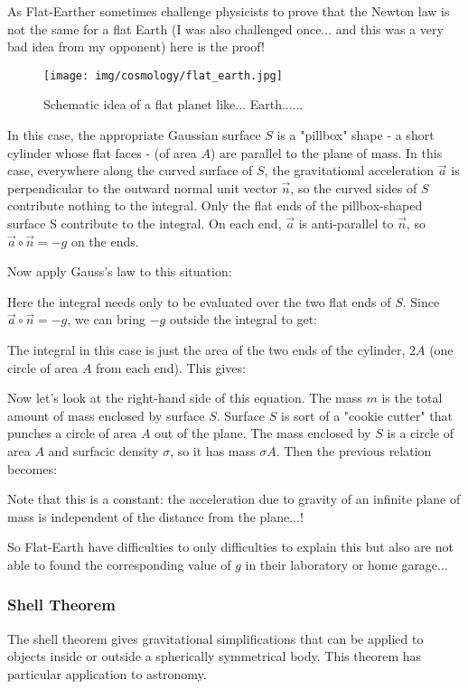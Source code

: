 	As Flat-Earther sometimes challenge physicists to prove that the Newton law is not the same for a flat Earth (I was also challenged once... and this was a very bad idea from my opponent) here is the proof!
	\begin{figure}[H]
		\centering
		\texttt{[image: img/cosmology/flat\_earth.jpg]}
		\caption[]{Schematic idea of a flat planet like... Earth......}
	\end{figure}
	In this case, the appropriate Gaussian surface $S$ is a "pillbox" shape - a short cylinder whose flat faces - (of area $A$) are parallel to the plane of mass. In this case, everywhere along the curved surface of $S$, the gravitational acceleration $\vec{a}$ is perpendicular to the outward normal unit vector $\vec{n}$, so the curved sides of $S$ contribute nothing to the integral. Only the flat ends of the pillbox-shaped surface S contribute to the integral. On each end, $\vec{a}$ is anti-parallel to $\vec{n}$, so $\vec{a}\circ\vec{n}=-g$ on the ends.
	
	Now apply Gauss's law to this situation:
	
	Here the integral needs only to be evaluated over the two flat ends of $S$. Since $\vec{a}\circ\vec{n}=-g$, we can bring $-g$ outside the integral to get:
	
	The integral in this case is just the area of the two ends of the cylinder, $2A$ (one circle of area $A$ from each end). This gives:
	
	Now let’s look at the right-hand side of this equation. The mass $m$ is the total amount of mass enclosed by surface $S$. Surface $S$ is sort of a "cookie cutter" that punches a circle of area $A$ out of the plane. The mass
enclosed by $S$ is a circle of area $A$ and surfacic density $\sigma$, so it has mass $\sigma A$. Then the previous relation becomes:
	
	Note that this is a constant: the acceleration due to gravity of an infinite plane of mass is independent of the distance from the plane...!

	So Flat-Earth have difficulties to only difficulties to explain this but also are not able to found the corresponding value of $g$ in their laboratory or home garage...

	\subsubsection{Shell Theorem}
	The shell theorem gives gravitational simplifications that can be applied to objects inside or outside a spherically symmetrical body. This theorem has particular application to astronomy.

